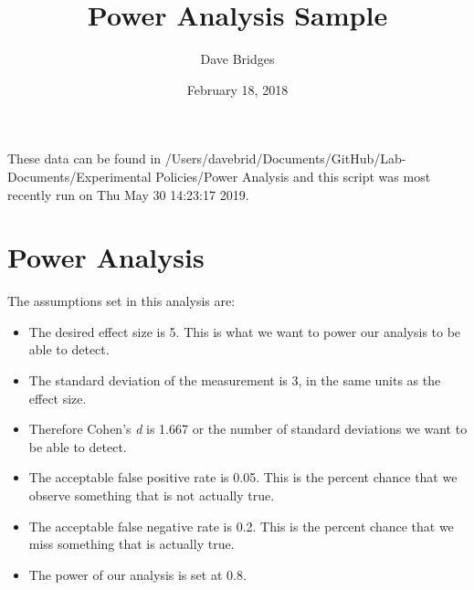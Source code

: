 \documentclass[]{article}
\title{Power Analysis Sample}
\author{Dave Bridges}
\date{February 18, 2018}
\newenvironment{Shaded}{\begin{snugshade}}{\end{snugshade}}
\newcommand{\KeywordTok}[1]{\textcolor[rgb]{0.13,0.29,0.53}{\textbf{#1}}}
\newcommand{\DataTypeTok}[1]{\textcolor[rgb]{0.13,0.29,0.53}{#1}}
\newcommand{\DecValTok}[1]{\textcolor[rgb]{0.00,0.00,0.81}{#1}}
\newcommand{\FloatTok}[1]{\textcolor[rgb]{0.00,0.00,0.81}{#1}}
\newcommand{\StringTok}[1]{\textcolor[rgb]{0.31,0.60,0.02}{#1}}
\newcommand{\CommentTok}[1]{\textcolor[rgb]{0.56,0.35,0.01}{\textit{#1}}}
\newcommand{\OperatorTok}[1]{\textcolor[rgb]{0.81,0.36,0.00}{\textbf{#1}}}
\newcommand{\NormalTok}[1]{#1}
\providecommand{\tightlist}{%
  \setlength{\itemsep}{0pt}\setlength{\parskip}{0pt}}
\begin{document}
\maketitle

{
\setcounter{tocdepth}{2}
\tableofcontents
}
These data can be found in
/Users/davebrid/Documents/GitHub/Lab-Documents/Experimental
Policies/Power Analysis and this script was most recently run on Thu May
30 14:23:17 2019.

\section{Power Analysis}\label{power-analysis}

\begin{Shaded}
\end{Shaded}

The assumptions set in this analysis are:

\begin{itemize}
\tightlist
\item
  The desired effect size is 5. This is what we want to power our
  analysis to be able to detect.
\item
  The standard deviation of the measurement is 3, in the same units as
  the effect size.
\item
  Therefore Cohen's \emph{d} is 1.667 or the number of standard
  deviations we want to be able to detect.
\item
  The acceptable false positive rate is 0.05. This is the percent chance
  that we observe something that is not actually true.
\item
  The acceptable false negative rate is 0.2. This is the percent chance
  that we miss something that is actually true.
\item
  The power of our analysis is set at 0.8.
\end{itemize}
\end{document}
